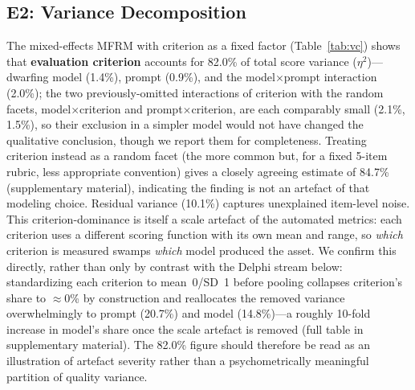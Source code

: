\documentclass[10pt]{article}
\begin{document}
\subsection{E2: Variance Decomposition}
\label{sec:e2}

The mixed-effects MFRM with criterion as a fixed factor (Table~\ref{tab:vc})
shows that \textbf{evaluation criterion} accounts for 82.0\% of total score
variance ($\eta^2$)---dwarfing model (1.4\%), prompt (0.9\%), and the
model$\times$prompt interaction (2.0\%); the two previously-omitted
interactions of criterion with the random facets, model$\times$criterion and
prompt$\times$criterion, are each comparably small (2.1\%, 1.5\%), so their
exclusion in a simpler model would not have changed the qualitative
conclusion, though we report them for completeness.
Treating criterion instead as a random facet (the more common but, for a
fixed 5-item rubric, less appropriate convention) gives a closely agreeing
estimate of 84.7\% (supplementary material), indicating the finding is
not an artefact of that modeling choice.
Residual variance (10.1\%) captures unexplained item-level noise.
This criterion-dominance is itself a scale artefact of the automated metrics:
each criterion uses a different scoring function with its own mean and range,
so \emph{which} criterion is measured swamps \emph{which} model produced the
asset. We confirm this directly, rather than only by contrast with the Delphi
stream below: standardizing each criterion to mean~0/SD~1 before pooling
collapses criterion's share to $\approx$0\% by construction and reallocates
the removed variance overwhelmingly to prompt (20.7\%) and model (14.8\%)---a
roughly 10-fold increase in model's share once the scale artefact is removed
(full table in supplementary material).
The 82.0\% figure should therefore be read as an illustration of artefact
severity rather than a psychometrically meaningful partition of quality
variance.
\end{document}

